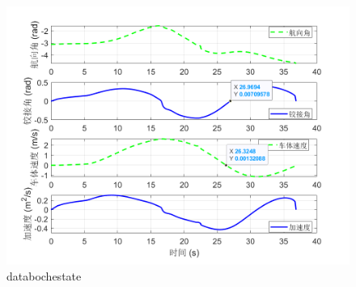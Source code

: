 \documentclass[master,academic]{ysuthesis} %
\begin{document}
		\begin{figure}[!ht]
			\centering
			\includegraphics[width=1\textwidth]{databochestate.png}
			\caption{databochestate}
			\label{fig:databochestate}
		\end{figure}
\end{document}
